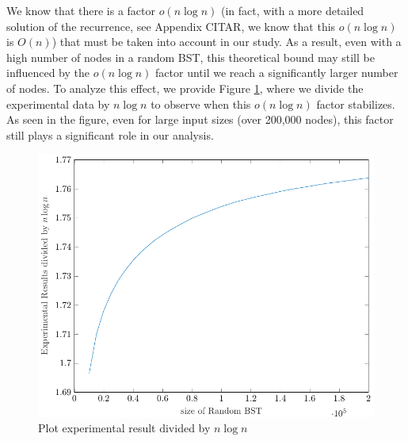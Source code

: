 We know that there is a factor \( o(n \log n) \) (in fact, with a more detailed solution of the recurrence, see Appendix CITAR, we know that this $o(n \log n)$ is $O(n)$) that must be taken into account in our study. As a result, even with a high number of nodes in a random BST, this theoretical bound may still be influenced by the \( o(n \log n) \) factor until we reach a significantly larger number of nodes. To analyze this effect, we provide Figure \ref{fig:plotBoundCtIPL}, where we divide the experimental data by \( n \log n \) to observe when this \( o(n \log n) \) factor stabilizes. As seen in the figure, even for large input sizes (over 200,000 nodes), this factor still plays a significant role in our analysis.

\begin{figure}[ht]
    \centering
    \includegraphics[scale=0.65]{plotCtIPL.pdf}
    \caption{Plot experimental result divided by $n \log n$}
    \label{fig:plotBoundCtIPL}
\end{figure}
